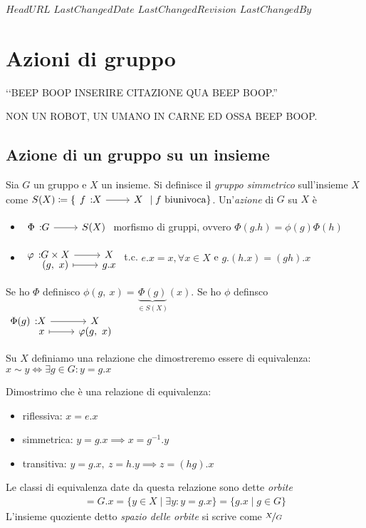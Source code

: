 \svnidlong
{$HeadURL$}
{$LastChangedDate$}
{$LastChangedRevision$}
{$LastChangedBy$}

\chapter{Azioni di gruppo}

\begin{introduction}
‘‘BEEP BOOP INSERIRE CITAZIONE QUA BEEP BOOP.''
\begin{flushright}
	\textsc{NON UN ROBOT,} UN UMANO IN CARNE ED OSSA BEEP BOOP.
\end{flushright}
\end{introduction}

\section{Azione di un gruppo su un insieme}
\begin{define}
	Sia $G$ un gruppo e $X$ un insieme. Si definisce il \textit{gruppo simmetrico} sull'insieme $X$ come $S(X)\coloneqq \{\funz f X X \mid f \text{ biunivoca}\}$. Un'\textit{azione} di $G$ su $X$ è
		\begin{itemize}
			\item  $\funz \Phi G {S(X)}$ morfismo di gruppi, ovvero $\Phi(g.h)=\phi(g)\Phi(h)$
			\item $\funztot \phi {G\times X} X {(g,\ x)} {g.x}$ t.c. $e.x=x, \forall x\in X$ e $g.(h.x)=(gh).x$
		\end{itemize}
	Se ho $\Phi$ definisco $\phi(g,\ x)=\underbrace{\Phi(g)}_{\in S(X)}(x)$.\newline
	Se ho $\phi$ definsco $\funztot {\Phi(g)} X X x {\phi(g,\ x)}$
\end{define}

\begin{define}
	Su $X$ definiamo una relazione che dimostreremo essere di equivalenza: $x\sim y\iff \exists g\in G \colon y=g.x$
\end{define}
Dimostrimo che è una relazione di equivalenza:
	\begin{itemize}
		\item riflessiva: $x=e.x$
		\item simmetrica: $y=g.x \implies x=g^{-1}.y$
		\item transitiva: $y=g.x,\ z=h.y \implies z=(hg).x$
	\end{itemize}
\begin{define}
	Le classi di equivalenza date da questa relazione sono dette \textit{orbite}
		\begin{gather*}
			[x]=G.x=\{y\in X \mid \exists y \colon y=g.x\}=\{ g.x\mid g\in G \}
		\end{gather*}
	L'insieme quoziente detto \textit{spazio delle orbite} si scrive come $\nicefrac{X}{G}$
\end{define}

